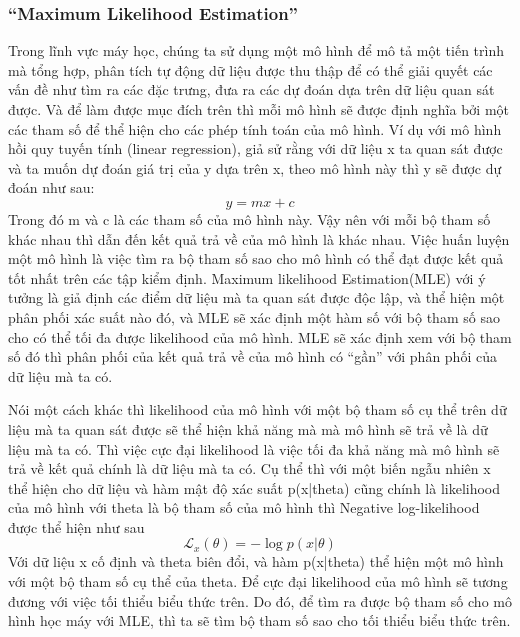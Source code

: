         \subsubsection{ ``Maximum Likelihood Estimation''}
        Trong lĩnh vực máy học, chúng ta sử dụng một mô hình để mô tả một tiến trình mà tổng hợp, phân tích tự động dữ liệu được thu thập để có thể giải quyết các vấn đề như tìm ra các đặc trưng, đưa ra các dự đoán dựa trên dữ liệu quan sát được. 
        Và để làm được mục đích trên thì mỗi mô hình sẽ được định nghĩa bởi một các tham số để thể hiện cho các phép tính toán của mô hình. 
        Ví dụ với mô hình hồi quy tuyến tính (linear regression),  giả sử rằng với dữ liệu x ta quan sát được và ta muốn dự đoán giá trị của y dựa trên x, theo mô hình này thì y sẽ được dự đoán như sau: 
        $$y = mx+c$$ 
        Trong đó m và c là các tham số của mô hình này. 
        Vậy nên với mỗi bộ tham số khác nhau thì dẫn đến kết quả trả về của mô hình là khác nhau.
        Việc huấn luyện một mô hình là việc tìm ra bộ tham số sao cho mô hình có thể đạt được kết quả tốt nhất trên các tập kiểm định. 
        Maximum likelihood Estimation(MLE) với ý tưởng là giả định các điểm dữ liệu mà ta quan sát được độc lập, và thể hiện một phân phối xác suất nào đó, và MLE sẽ xác định một hàm số với bộ tham số sao cho có thể tối đa được likelihood của mô hình.       
        MLE sẽ xác định xem với bộ tham số đó thì phân phối của kết quả trả về của mô hình có ``gần'' với phân phối của dữ liệu mà ta có.
        
        Nói một cách khác thì likelihood của mô hình với một bộ tham số cụ thể trên dữ liệu mà ta quan sát được sẽ thể hiện khả năng mà mà mô hình sẽ trả về là dữ liệu mà ta có.
        Thì việc cực đại likelihood là việc tối đa khả năng mà mô hình sẽ trả về kết quả chính là dữ liệu mà ta có.
        Cụ thể thì với một biến ngẫu nhiên x thể hiện cho dữ liệu và hàm mật độ  xác suất p(x|theta) cũng chính là likelihood của mô hình với theta là bộ tham số của mô hình thì Negative log-likelihood được thể hiện như sau 
        $$\mathcal{L}_x(\theta) = -\log p(x|\theta)$$
        Với dữ liệu x cố định và theta biên đổi, và hàm p(x|theta) thể hiện một mô hình với một bộ tham số cụ thể của theta. 
        Để cực đại likelihood của mô hình sẽ tương đương với việc tối  thiểu biểu thức trên. 
        Do đó, để tìm ra được bộ tham số cho mô hình học máy với MLE, thì ta sẽ tìm bộ tham số sao cho tối thiểu biểu thức trên.  
        
        
    


